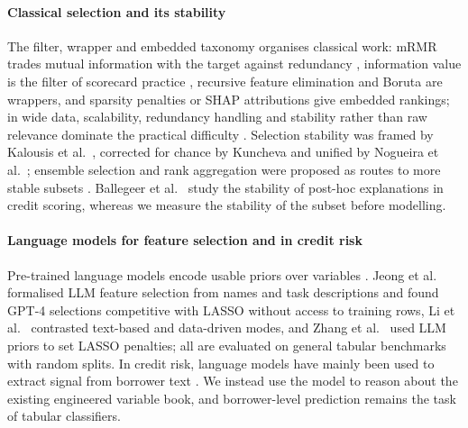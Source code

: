 \documentclass[final,5p,twocolumn]{elsarticle}
\begin{document}
\paragraph{Classical selection and its stability}
The filter, wrapper and embedded taxonomy \cite{kohavi1997,guyon2003} organises classical work: mRMR trades mutual information with the target against redundancy \cite{peng2005}, information value is the filter of scorecard practice \cite{siddiqi2006}, recursive feature elimination \cite{guyon2002} and Boruta \cite{kursa2010,breiman2001} are wrappers, and sparsity penalties \cite{tibshirani1996} or SHAP attributions \cite{lundberg2017} give embedded rankings; in wide data, scalability, redundancy handling and stability rather than raw relevance dominate the practical difficulty \cite{boloncanedo2015}. Selection stability was framed by Kalousis et al.\ \cite{kalousis2007}, corrected for chance by Kuncheva \cite{kuncheva2007} and unified by Nogueira et al.\ \cite{nogueira2018}; ensemble selection and rank aggregation were proposed as routes to more stable subsets \cite{saeys2008,dwork2001}. Ballegeer et al.\ \cite{ballegeer2025} study the stability of post-hoc explanations in credit scoring, whereas we measure the stability of the subset before modelling.

\paragraph{Language models for feature selection and in credit risk}
Pre-trained language models encode usable priors over variables \cite{choi2022}. Jeong et al.\ \cite{jeong2025} formalised LLM feature selection from names and task descriptions and found GPT-4 selections competitive with LASSO without access to training rows, Li et al.\ \cite{li2025sigkdd} contrasted text-based and data-driven modes, and Zhang et al.\ \cite{zhang2025llmlasso} used LLM priors to set LASSO penalties; all are evaluated on general tabular benchmarks with random splits. In credit risk, language models have mainly been used to extract signal from borrower text \cite{sanzguerrero2025,xia2025}. We instead use the model to reason about the existing engineered variable book, and borrower-level prediction remains the task of tabular classifiers.
\end{document}
